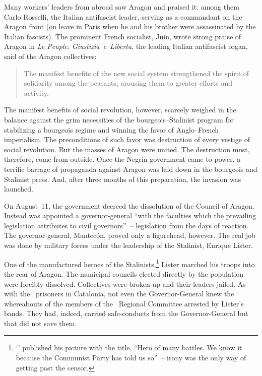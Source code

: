 \vskip -1pt

Many workers’ leaders from abroad saw Aragon and praised it: among them Carlo Rosselli, the Italian antifascist leader, serving as a commandant on the Aragon front (on leave in Paris when he and his brother were assassinated by the Italian fascists). The prominent French socialist, Juin, wrote strong praise of Aragon in \emph{Le Peuple.} \emph{Giustizia~e~Liberta,} the leading Italian antifascist organ, said of the Aragon collectives:

\vskip -1pt

\begin{quotation}
  The manifest benefits of the new social system strengthened the spirit of solidarity among the peasants, arousing them to greater efforts and activity.
\end{quotation}


\begin{sloppypar}
The manifest benefits of social revolution, however, scarcely weighed in the balance against the grim necessities of the bourgeois--Stalinist program for stabilizing a bourgeois regime and winning the favor of Anglo--French imperialism. The preconditions of such favor was destruction of every vestige of social revolution. But the masses of Aragon were united. The destruction must, therefore, come from outside. Once the Negr\'in government came to power, a terrific barrage of propaganda against Aragon was laid down in the bourgeois and Stalinist press. And, after three months of this preparation, the invasion was launched.
\end{sloppypar}

On August~11, the government decreed the dissolution of the Council of Aragon. Instead was appointed a governor-general ``with the faculties which the prevailing legislation attributes to civil governors''~-- legislation from the days of reaction. The governor-general, Mantec\'on, proved only a figurehead, however. The real job was done by military forces under the leadership of the Stalinist\kn, Enrique Lister.

One of the manufactured heroes of the Stalinists,\kn\kn\footnote{`\CNT' published his picture with the title, ``Hero of many battles. We know it because the Communist Party has told us so''~-- irony was the only way of getting past the censor.} Lister marched his troops into the rear of Aragon. The municipal councils elected directly by the population were forcibly dissolved. Collectives were broken up and their leaders jailed. As with the \POUM\ prisoners in Catalonia, not even the Governor-General knew the whereabouts of the members of the \CNT\ Regional Committee arrested by Lister’s bands. They had, indeed, carried safe-conducts from the Governor-General but that did not save them.


